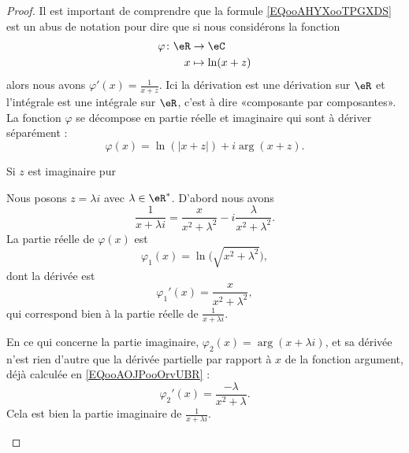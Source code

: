 \begin{proof}
    Il est important de comprendre que la formule \eqref{EQooAHYXooTPGXDS} est un abus de notation pour dire que si nous considérons la fonction
    \begin{equation}
        \begin{aligned}
            \varphi\colon \eR&\to \eC \\
            x&\mapsto \ln(x+z) 
        \end{aligned}
    \end{equation}
    alors nous avons \( \varphi'(x)=\frac{1}{ x+z }\). Ici la dérivation est une dérivation sur \( \eR\) et l'intégrale est une intégrale sur \( \eR\), c'est à dire «composante par composantes». La fonction \(  \varphi\) se décompose en partie réelle et imaginaire qui sont à dériver séparément :
    \begin{equation}
        \varphi(x)=\ln(| x+z |)+i\arg(x+z).
    \end{equation}

    \begin{subproof}

        \item[Si \( z\) est imaginaire pur]
        
            Nous posons \( z=\lambda i\) avec \( \lambda\in \eR^*\). D'abord nous avons
            \begin{equation}
                \frac{1}{ x+\lambda i }=\frac{ x }{ x^2+\lambda^2 }-i\frac{ \lambda }{ x^2+\lambda^2 }.
            \end{equation}
            La partie réelle de \( \varphi(x)\) est 
            \begin{equation}
                \varphi_1(x)=\ln\big( \sqrt{ x^2+\lambda^2 } \big),
            \end{equation}
            dont la dérivée est
            \begin{equation}
                \varphi_1'(x)=\frac{ x }{ x^2+\lambda^2 },
            \end{equation}
            qui correspond bien à la partie réelle de \( \frac{1}{ x+\lambda i }\).

            En ce qui concerne la partie imaginaire, \( \varphi_2(x)=\arg(x+\lambda i)\), et sa dérivée n'est rien d'autre que la dérivée partielle par rapport à \( x\) de la fonction argument, déjà calculée en \eqref{EQooAOJPooOrvUBR} :
            \begin{equation}
                \varphi_2'(x)=\frac{ -\lambda }{ x^2+\lambda }.
            \end{equation}
            Cela est bien la partie imaginaire de \( \frac{1}{ x+\lambda i }\).


\end{subproof}
\end{proof}
